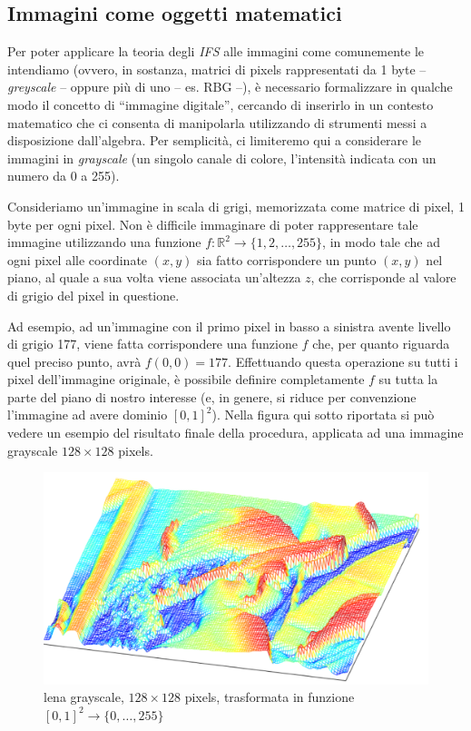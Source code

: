 \documentclass[11pt,a4paper,appendixprefix=true,numbers=noenddot]{scrreprt}
\begin{document}
\subsection*{Immagini come oggetti matematici}

Per poter applicare la teoria degli \emph{IFS} alle immagini come comunemente le intendiamo (ovvero, in sostanza, matrici di pixels rappresentati  da 1 byte -- \emph{greyscale} -- oppure più di uno -- es. RBG --), è necessario formalizzare in qualche modo il concetto di ``immagine digitale'', cercando di inserirlo in un contesto matematico che ci consenta di manipolarla utilizzando di strumenti messi a disposizione dall'algebra. Per semplicità, ci limiteremo qui a considerare le immagini in \emph{grayscale} (un singolo canale di colore, l'intensità indicata con un numero da 0 a 255).

Consideriamo un'immagine in scala di grigi, memorizzata come matrice di pixel, 1 byte per ogni pixel. Non è difficile immaginare di poter rappresentare tale immagine utilizzando una funzione $f: \mathbb{R}^2 \rightarrow  \{1, 2, \ldots, 255 \}$, in modo tale che ad ogni pixel alle coordinate $(x, y)$ sia fatto corrispondere un punto $(x, y)$ nel piano, al quale a sua volta viene associata un'altezza $z$, che corrisponde al valore di grigio del pixel in questione. 

Ad esempio, ad un'immagine con il primo pixel in basso a sinistra avente livello di grigio 177, viene fatta corrispondere una funzione $f$ che, per quanto riguarda quel preciso punto, avrà $f(0,0) = 177$. Effettuando questa operazione su tutti i pixel dell'immagine originale, è possibile definire completamente $f$ su tutta la parte del piano di nostro interesse (e, in genere, si riduce per convenzione l'immagine ad avere dominio 
$[0, 1]^2$). Nella figura qui sotto riportata si può vedere un esempio del risultato finale della procedura, applicata ad una immagine grayscale $128 \times 128$ pixels.

\begin{figure}[!ht]
\centering
\includegraphics[scale=0.6]{images/lena-mash.pdf} 
\caption{lena grayscale, $128 \times 128$ pixels, trasformata in funzione $[0,1]^2 \rightarrow \{0,\ldots,255 \}$}
\end{figure}
\end{document}
